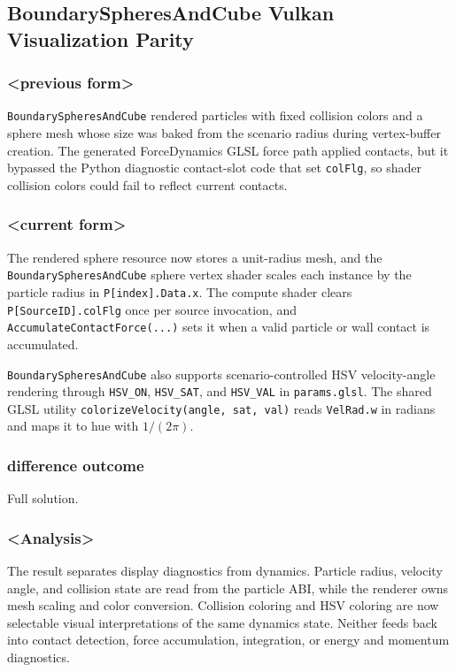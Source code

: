\subsection{BoundarySpheresAndCube Vulkan Visualization Parity}

\subsubsection{<previous form>}

\texttt{BoundarySpheresAndCube} rendered particles with fixed collision
colors and a sphere mesh whose size was baked from the scenario radius during
vertex-buffer creation.  The generated ForceDynamics GLSL force path applied
contacts, but it bypassed the Python diagnostic contact-slot code that set
\texttt{colFlg}, so shader collision colors could fail to reflect current
contacts.

\subsubsection{<current form>}

The rendered sphere resource now stores a unit-radius mesh, and the
\texttt{BoundarySpheresAndCube} sphere vertex shader scales each instance by
the particle radius in \texttt{P[index].Data.x}.  The compute shader clears
\texttt{P[SourceID].colFlg} once per source invocation, and
\texttt{AccumulateContactForce(...)} sets it when a valid particle or wall
contact is accumulated.

\texttt{BoundarySpheresAndCube} also supports scenario-controlled HSV
velocity-angle rendering through \texttt{HSV\_ON}, \texttt{HSV\_SAT}, and
\texttt{HSV\_VAL} in \texttt{params.glsl}.  The shared GLSL utility
\texttt{colorizeVelocity(angle, sat, val)} reads \texttt{VelRad.w} in radians
and maps it to hue with \(1/(2\pi)\).

\subsubsection{difference outcome}

Full solution.

\subsubsection{<Analysis>}

The result separates display diagnostics from dynamics.  Particle radius,
velocity angle, and collision state are read from the particle ABI, while the
renderer owns mesh scaling and color conversion.  Collision coloring and HSV
coloring are now selectable visual interpretations of the same dynamics state.
Neither feeds back into contact detection, force accumulation, integration, or
energy and momentum diagnostics.

